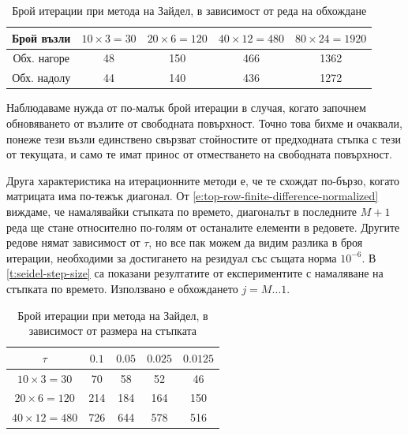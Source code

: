\documentclass[12pt]{article}
\numberwithin{equation}{section}
\begin{document}
\begin{table}[h]
    \centering
    \begin{tabular}{c|cccc}
        \toprule[1.5pt]
        Брой възли    & $10\times 3=30$ & $20\times 6=120$ & $40\times 12=480$ & $80\times 24=1920$ \\
        \midrule
        Обх. нагоре & 48              & 150              & 466 & 1362 \\
        Обх. надолу & 44              & 140              & 436 & 1272 \\
        \bottomrule[1.5pt]
    \end{tabular}
    \caption{Брой итерации при метода на Зайдел, в зависимост от реда на обхождане}
    \label{t:seidel-order-compare}
\end{table}

Наблюдаваме нужда от по-малък брой итерации в случая, когато започнем обновяването от възлите от свободната повърхност. Точно това бихме и очаквали, понеже тези възли единствено свързват стойностите от предходната стъпка с тези от текущата, и само те имат принос от отместването на свободната повърхност.

Друга характеристика на итерационните методи е, че те схождат по-бързо, когато матрицата има по-тежък диагонал. От \autoref{e:top-row-finite-difference-normalized} виждаме, че намалявайки стъпката по времето, диагоналът в последните $M+1$ реда ще стане относително по-голям от останалите елементи в редовете. Другите редове нямат зависимост от $\tau$, но все пак можем да видим разлика в броя итерации, необходими за достигането на резидуал със същата норма $10^{-6}$. В \autoref{t:seidel-step-size} са показани резултатите от експериментите с намаляване на стъпката по времето. Използвано е обхождането $j=M \dots 1$.

\begin{table}[h]
    \centering
    \begin{tabular}{c|cccc}
        \toprule[1.5pt]
        $\tau$            & $0.1$ & $0.05$ & $0.025$ & $0.0125$ \\
        \midrule
        $10\times 3=30$   & 70    & 58     & 52      & 46 \\
        $20\times 6=120$  & 214   & 184    & 164     & 150 \\
        $40\times 12=480$ & 726   & 644    & 578     & 516 \\
        \bottomrule[1.5pt]
    \end{tabular}
    \caption{Брой итерации при метода на Зайдел, в зависимост от размера на стъпката}
    \label{t:seidel-step-size}
\end{table}
\end{document}
